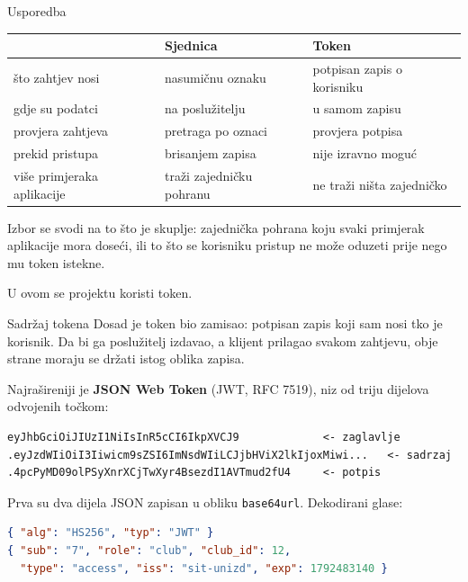 \begin{frame}{Usporedba}
\begin{center}
{\small
\setlength{\tabcolsep}{7pt}
\renewcommand{\arraystretch}{1.4}
\begin{tabular}{@{}L{3.2cm}L{4.0cm}L{4.0cm}@{}}
  \toprule
   & \textbf{Sjednica} & \textbf{Token} \\
  \midrule
  što zahtjev nosi           & nasumičnu oznaku          & potpisan zapis o korisniku \\
  gdje su podatci            & na poslužitelju           & u samom zapisu \\
  provjera zahtjeva          & pretraga po oznaci        & provjera potpisa \\
  prekid pristupa            & brisanjem zapisa          & nije izravno moguć \\
  više primjeraka aplikacije & traži zajedničku pohranu  & ne traži ništa zajedničko \\
  \bottomrule
\end{tabular}
}
\end{center}

\vspace{0.12em}
Izbor se svodi na to što je skuplje: zajednička pohrana koju svaki primjerak aplikacije mora doseći, ili to što se korisniku pristup ne može oduzeti prije nego mu token istekne.

\vspace{0.3em}
U ovom se projektu koristi token.
\end{frame}


\begin{frame}[fragile]{Sadržaj tokena}
Dosad je token bio zamisao: potpisan zapis koji sam nosi tko je korisnik. Da bi ga poslužitelj izdavao, a klijent prilagao svakom zahtjevu, obje strane moraju se držati istog oblika zapisa.

\vspace{1.1em}
Najrašireniji je \textbf{JSON Web Token} (JWT, RFC 7519), niz od triju dijelova odvojenih točkom:

\begin{lstlisting}
eyJhbGciOiJIUzI1NiIsInR5cCI6IkpXVCJ9             <- zaglavlje
.eyJzdWIiOiI3Iiwicm9sZSI6ImNsdWIiLCJjbHViX2lkIjoxMiwi...   <- sadrzaj
.4pcPyMD09olPSyXnrXCjTwXyr4BsezdI1AVTmud2fU4     <- potpis
\end{lstlisting}

\vspace{0.6em}
Prva su dva dijela JSON zapisan u obliku \texttt{base64url}. Dekodirani glase:

\begin{lstlisting}[language=json]
{ "alg": "HS256", "typ": "JWT" }
{ "sub": "7", "role": "club", "club_id": 12,
  "type": "access", "iss": "sit-unizd", "exp": 1792483140 }
\end{lstlisting}
\end{frame}

